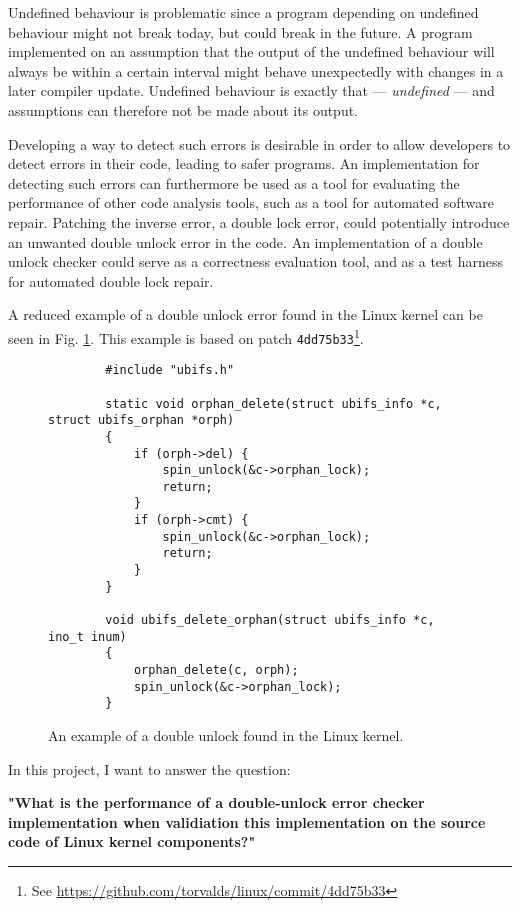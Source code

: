 \newpar Undefined behaviour is problematic since a program depending on undefined behaviour might not break today, but could break in the future. A program implemented on an assumption that the output of the undefined behaviour will always be within a certain interval might behave unexpectedly with changes in a later compiler update. Undefined behaviour is exactly that --- \textit{undefined} --- and assumptions can therefore not be made about its output.

\newpar Developing a way to detect such errors is desirable in order to allow developers to detect errors in their code, leading to safer programs. An implementation for detecting such errors can furthermore be used as a tool for evaluating the performance of other code analysis tools, such as a tool for automated software repair. Patching the inverse error, a double lock error, could potentially introduce an unwanted double unlock error in the code. An implementation of a double unlock checker could serve as a correctness evaluation tool, and as a test harness for automated double lock repair.

\newpar A reduced example of a double unlock error found in the Linux kernel can be seen in Fig. \ref{fig:introexample}. This example is based on patch \texttt{4dd75b33}\footnote{See \url{https://github.com/torvalds/linux/commit/4dd75b33}}.

\begin{figure}[H]
    \centering
    \begin{verbatim}
        #include "ubifs.h"

        static void orphan_delete(struct ubifs_info *c, struct ubifs_orphan *orph)
        {
            if (orph->del) {
                spin_unlock(&c->orphan_lock);
                return;
            }
            if (orph->cmt) {
                spin_unlock(&c->orphan_lock);
                return;
            }
        }
        
        void ubifs_delete_orphan(struct ubifs_info *c, ino_t inum)
        {
            orphan_delete(c, orph);
            spin_unlock(&c->orphan_lock);
        }
    \end{verbatim}
    \caption{An example of a double unlock found in the Linux kernel.}
    \label{fig:introexample}
\end{figure}
\newpar In this project, I want to answer the question:

\begin{center}
    \textbf{"What is the performance of a double-unlock error checker implementation when validiation this implementation on the source code of Linux kernel components?"} 
\end{center}

